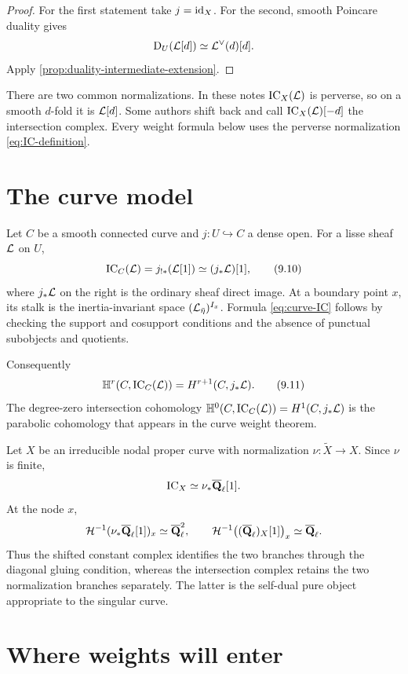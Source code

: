 \begin{proof}
For the first statement take \(j=\operatorname{id}_X\).  For the second, smooth Poincare
duality gives
\[
  \mathrm D_U(\mathcal L[d])\simeq\mathcal L^\vee(d)[d].
\]
Apply \cref{prop:duality-intermediate-extension}.
\end{proof}

There are two common normalizations.  In these notes \(\operatorname{IC}_X(\mathcal L)\) is
perverse, so on a smooth \(d\)-fold it is \(\mathcal L[d]\).  Some authors shift back
and call \(\operatorname{IC}_X(\mathcal L)[-d]\) the intersection complex.  Every weight formula
below uses the perverse normalization \eqref{eq:IC-definition}.

\section{The curve model}

Let \(C\) be a smooth connected curve and \(j:U\hookrightarrow C\) a dense
open.  For a lisse sheaf \(\mathcal L\) on \(U\),
\[
  \operatorname{IC}_C(\mathcal L)=j_{!*}(\mathcal L[1])\simeq (j_*\mathcal L)[1],
\tag{9.10}\label{eq:curve-IC}
\]
where \(j_*\mathcal L\) on the right is the ordinary sheaf direct image.  At a
boundary point \(x\), its stalk is the inertia-invariant space
\((\mathcal L_{\bar\eta})^{I_x}\).  Formula \eqref{eq:curve-IC} follows by checking
the support and cosupport conditions and the absence of punctual subobjects
and quotients.

Consequently
\[
  \mathbb H^r(C,\operatorname{IC}_C(\mathcal L))
  =H^{r+1}(C,j_*\mathcal L).
\tag{9.11}\label{eq:curve-IH}
\]
The degree-zero intersection cohomology
\(\mathbb H^0(C,\operatorname{IC}_C(\mathcal L))=H^1(C,j_*\mathcal L)\) is the parabolic cohomology that
appears in the curve weight theorem.

\begin{example}
Let \(X\) be an irreducible nodal proper curve with normalization
\(\nu:\widetilde X\to X\).  Since \(\nu\) is finite,
\[
  \operatorname{IC}_X\simeq\nu_*\overline{\mathbf Q}_\ell[1].
\]
At the node \(x\),
\[
 \mathcal H^{-1}(\nu_*\overline{\mathbf Q}_\ell[1])_x\simeq\overline{\mathbf Q}_\ell^2,
 \qquad
 \mathcal H^{-1}\bigl((\overline{\mathbf Q}_\ell)_X[1]\bigr)_x\simeq\overline{\mathbf Q}_\ell.
\]
Thus the shifted constant complex identifies the two branches through the
diagonal gluing condition, whereas the intersection complex retains the two
normalization branches separately.  The latter is the self-dual pure object
appropriate to the singular curve.
\end{example}

\section{Where weights will enter}

